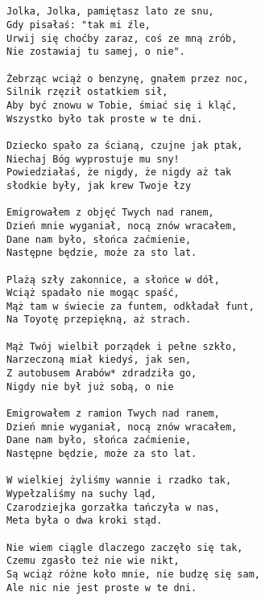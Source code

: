 \documentclass[12pt]{article}
\begin{document}
\subsection*{}
\begin{verbatim}
Jolka, Jolka, pamiętasz lato ze snu,
Gdy pisałaś: "tak mi źle,
Urwij się choćby zaraz, coś ze mną zrób,
Nie zostawiaj tu samej, o nie".

Żebrząc wciąż o benzynę, gnałem przez noc,
Silnik rzęził ostatkiem sił,
Aby być znowu w Tobie, śmiać się i kląć,
Wszystko było tak proste w te dni.

Dziecko spało za ścianą, czujne jak ptak,
Niechaj Bóg wyprostuje mu sny!
Powiedziałaś, że nigdy, że nigdy aż tak
słodkie były, jak krew Twoje łzy

Emigrowałem z objęć Twych nad ranem,
Dzień mnie wyganiał, nocą znów wracałem,
Dane nam było, słońca zaćmienie,
Następne będzie, może za sto lat.

Plażą szły zakonnice, a słońce w dół,
Wciąż spadało nie mogąc spaść,
Mąż tam w świecie za funtem, odkładał funt,
Na Toyotę przepiękną, aż strach.

Mąż Twój wielbił porządek i pełne szkło,
Narzeczoną miał kiedyś, jak sen,
Z autobusem Arabów* zdradziła go,
Nigdy nie był już sobą, o nie

Emigrowałem z ramion Twych nad ranem,
Dzień mnie wyganiał, nocą znów wracałem,
Dane nam było, słońca zaćmienie,
Następne będzie, może za sto lat.

W wielkiej żyliśmy wannie i rzadko tak,
Wypełzaliśmy na suchy ląd,
Czarodziejka gorzałka tańczyła w nas,
Meta była o dwa kroki stąd.

Nie wiem ciągle dlaczego zaczęło się tak,
Czemu zgasło też nie wie nikt,
Są wciąż różne koło mnie, nie budzę się sam,
Ale nic nie jest proste w te dni.
\end{verbatim}
\clearpage
\end{document}
